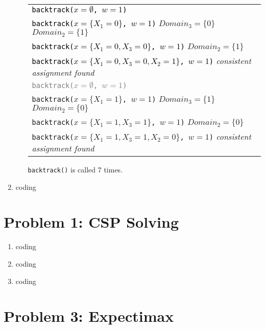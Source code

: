 \documentclass[10pt]{article}
\begin{document}
\begin{enumerate}[label=(\alph*)]
\begin{enumerate}[label=\roman*.]
		\begin{tabular}{l}
		\textcolor{black}{\texttt{backtrack($x = \emptyset$, $w = 1$)}}\\
		\textcolor{black}{\texttt{backtrack($x = \{ X_1 = 0 \}$, $w = 1$)}} $Domain_3 = \{ 0 \}$ $Domain_2 = \{ 1 \}$ \\
		\textcolor{black}{\texttt{backtrack($x = \{ X_1 = 0, X_3 = 0 \}$, $w = 1$)}} $Domain_2 = \{ 1 \}$\\
		\textcolor{black}{\texttt{backtrack($x = \{ X_1 = 0, X_3 = 0, X_2 = 1 \}$, $w = 1$)}} \textit{consistent assignment found}\\
		\hline
		\textcolor{gray}{\texttt{backtrack($x = \emptyset$, $w = 1$)}}\\
		\texttt{backtrack($x = \{ X_1 = 1 \}$, $w = 1$)} $Domain_3 = \{ 1 \}$ $Domain_2 = \{ 0 \}$\\
		\texttt{backtrack($x = \{ X_1 = 1, X_3 = 1 \}$, $w = 1$)} $Domain_2 = \{ 0 \}$\\
		\texttt{backtrack($x = \{ X_1 = 1, X_3 = 1, X_2 = 0 \}$, $w = 1$)} \textit{consistent assignment found}\\
  		\end{tabular}
  		
  		\texttt{backtrack()} is called 7 times.
	\end{enumerate}
	
	\item coding

\end{enumerate}

\section*{\normalsize Problem 1: CSP Solving}

\begin{enumerate}[label=(\alph*)]

  \item coding
  
  \item coding
  
  \item coding

\end{enumerate}
\iffalse
\section*{\normalsize Problem 3: Expectimax}
\end{document}
